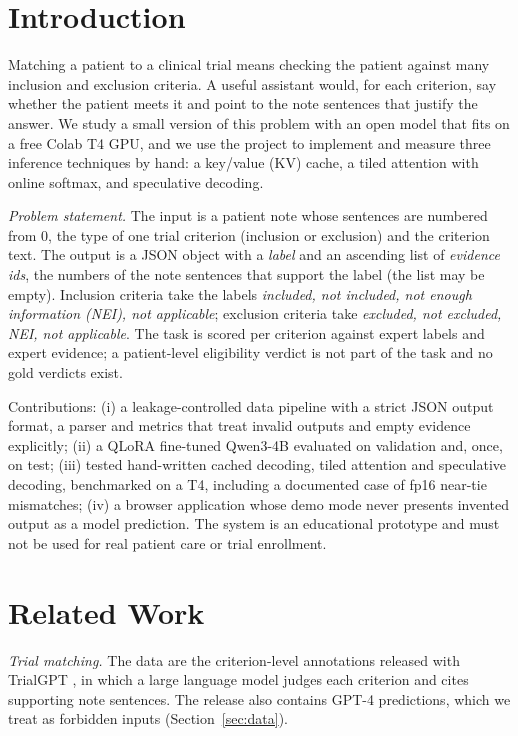 \documentclass[conference]{IEEEtran}
\begin{document}
\section{Introduction}
Matching a patient to a clinical trial means checking the patient against many inclusion and exclusion criteria. A useful assistant would, for each criterion, say whether the patient meets it and point to the note sentences that justify the answer. We study a small version of this problem with an open model that fits on a free Colab T4 GPU, and we use the project to implement and measure three inference techniques by hand: a key/value (KV) cache, a tiled attention with online softmax, and speculative decoding.

\emph{Problem statement.} The input is a patient note whose sentences are numbered from 0, the type of one trial criterion (inclusion or exclusion) and the criterion text. The output is a JSON object with a \emph{label} and an ascending list of \emph{evidence ids}, the numbers of the note sentences that support the label (the list may be empty). Inclusion criteria take the labels \emph{included, not included, not enough information (NEI), not applicable}; exclusion criteria take \emph{excluded, not excluded, NEI, not applicable}. The task is scored per criterion against expert labels and expert evidence; a patient-level eligibility verdict is not part of the task and no gold verdicts exist.

Contributions: (i) a leakage-controlled data pipeline with a strict JSON output format, a parser and metrics that treat invalid outputs and empty evidence explicitly; (ii) a QLoRA fine-tuned Qwen3-4B evaluated on validation and, once, on test; (iii) tested hand-written cached decoding, tiled attention and speculative decoding, benchmarked on a T4, including a documented case of fp16 near-tie mismatches; (iv) a browser application whose demo mode never presents invented output as a model prediction. The system is an educational prototype and must not be used for real patient care or trial enrollment.

\section{Related Work}
\emph{Trial matching.} The data are the criterion-level annotations released with TrialGPT \cite{trialgpt}, in which a large language model judges each criterion and cites supporting note sentences. The release also contains GPT-4 predictions, which we treat as forbidden inputs (Section~\ref{sec:data}).
\end{document}
